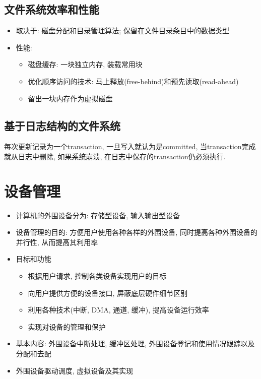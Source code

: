 \documentclass[a4paper, UTF8]{article}
\begin{document}
\subsection{文件系统效率和性能}
\begin{itemize}
\item 取决于: 磁盘分配和目录管理算法; 保留在文件目录条目中的数据类型
\item 性能:
	\begin{itemize}
	\item 磁盘缓存: 一块独立内存, 装载常用块
	\item 优化顺序访问的技术: 马上释放(free-behind)和预先读取(read-ahead)
	\item 留出一块内存作为虚拟磁盘
	\end{itemize}
\end{itemize}

\subsection{基于日志结构的文件系统}
每次更新记录为一个transaction, 一旦写入就认为是committed, 当transaction完成就从日志中删除, 如果系统崩溃, 在日志中保存的transaction仍必须执行.

\newpage
\section{设备管理}
\begin{itemize}
\item 计算机的外围设备分为: 存储型设备, 输入输出型设备
\item 设备管理的目的: 方便用户使用各种各样的外围设备, 同时提高各种外围设备的并行性, 从而提高其利用率
\item 目标和功能
	\begin{itemize}
	\item 根据用户请求, 控制各类设备实现用户的目标
	\item 向用户提供方便的设备接口, 屏蔽底层硬件细节区别
	\item 利用各种技术(中断, DMA, 通道, 缓冲), 提高设备运行效率
	\item 实现对设备的管理和保护
	\end{itemize}
\item 基本内容: 外围设备中断处理, 缓冲区处理, 外围设备登记和使用情况跟踪以及分配和去配
\item 外围设备驱动调度, 虚拟设备及其实现
\end{itemize}
\end{document}
